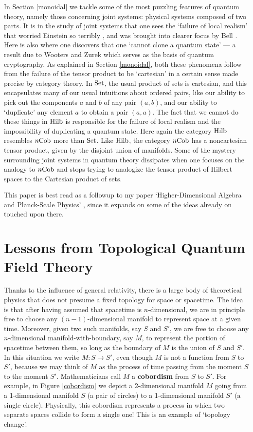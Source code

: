 \documentclass{article}
\newcommand{\Set}{{\rm Set}}
\newcommand{\Hilb}{{\rm Hilb}}
\newcommand{\Cob}{{\rm Cob}}
\renewcommand{\to}{\rightarrow}
\newcommand{\maps}{\colon}
\begin{document}
In Section \ref{monoidal} we tackle some of the most puzzling
features of quantum theory, namely those concerning joint systems:
physical systems composed of two parts.  It is in the study of joint
systems that one sees the `failure of local realism' that worried
Einstein so terribly \cite{EPR}, and was brought into clearer focus by
Bell \cite{Bell}.  Here is also where one discovers that one `cannot
clone a quantum state' --- a result due to Wooters and Zurek \cite{WZ}
which serves as the basis of quantum cryptography.  As explained in
Section \ref{monoidal}, both these phenomena follow from the failure
of the tensor product to be `cartesian' in a certain sense made
precise by category theory.  In $\Set$, the usual product of sets 
is cartesian, and this encapsulates many of our usual intuitions
about ordered pairs, like our ability to pick out the components $a$
and $b$ of any pair $(a,b)$, and our ability to `duplicate' any
element $a$ to obtain a pair $(a,a)$.  The fact that we cannot do
these things in $\Hilb$ is responsible for the failure of local
realism and the impossibility of duplicating a quantum state.  Here
again the category $\Hilb$ resembles $n\Cob$ more than $\Set$.  Like
$\Hilb$, the category $n\Cob$ has a noncartesian tensor product, given
by the disjoint union of manifolds.  Some of the mystery surrounding
joint systems in quantum theory dissipates when one focuses on the
analogy to $n\Cob$ and stops trying to analogize the tensor product of
Hilbert spaces to the Cartesian product of sets.

This paper is best read as a followup to my paper `Higher-Dimensional
Algebra and Planck-Scale Physics' \cite{B3}, since it expands on
some of the ideas already on touched upon there.  

\section{Lessons from Topological Quantum Field Theory} \label{TQFT}

Thanks to the influence of general relativity, there is a large
body of theoretical physics that does not presume a fixed topology 
for space or spacetime.  The idea is that after having assumed that
spacetime is $n$-dimensional, we are in principle free to choose any 
$(n-1)$-dimensional manifold to represent space at a given time.  
Moreover, given two such manifolds, say $S$ and $S'$, we are free to 
choose any $n$-dimensional manifold-with-boundary, say $M$, 
to represent the portion of spacetime between them, so long as 
the boundary of $M$ is the union of $S$ and $S'$.  In this situation 
we write $M \maps S \to S'$, even though $M$ is not a function from 
$S$ to $S'$, because we may think of $M$ as the process of time passing 
from the moment $S$ to the moment $S'$.  Mathematicians call $M$ a 
{\bf cobordism} from $S$ to $S'$.  For example, in Figure 
\ref{cobordism} we depict a 2-dimensional manifold $M$ going from 
a 1-dimensional manifold $S$ (a pair of circles) to a 1-dimensional 
manifold $S'$ (a single circle).   Physically, this cobordism 
represents a process in which two separate spaces collide to form a 
single one!  This is an example of `topology change'.
\end{document}
